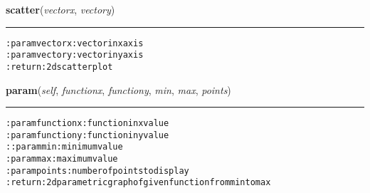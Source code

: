     \label{hal:maths:plotter:Plot2d:scatter}

    \vspace{0.5ex}

\hspace{.8\funcindent}\begin{boxedminipage}{\funcwidth}

    \raggedright \textbf{scatter}(\textit{vectorx}, \textit{vectory})

    \vspace{-1.5ex}

    \rule{\textwidth}{0.5\fboxrule}
\setlength{\parskip}{2ex}
\begin{alltt}

:param vectorx: vector in x axis
:param vectory: vector in y axis
:return: 2d scatter plot
\end{alltt}

\setlength{\parskip}{1ex}
    \end{boxedminipage}

    \label{hal:maths:plotter:Plot2d:param}

    \vspace{0.5ex}

\hspace{.8\funcindent}\begin{boxedminipage}{\funcwidth}

    \raggedright \textbf{param}(\textit{self}, \textit{functionx}, \textit{functiony}, \textit{min}, \textit{max}, \textit{points})

    \vspace{-1.5ex}

    \rule{\textwidth}{0.5\fboxrule}
\setlength{\parskip}{2ex}
\begin{alltt}

:param functionx: function in x value
:param functiony: function in y value
::param min: minimum value
:param max: maximum value
:param points: number of points to display
:return: 2d parametric graph of given function from min to max
\end{alltt}

\setlength{\parskip}{1ex}
    \end{boxedminipage}


